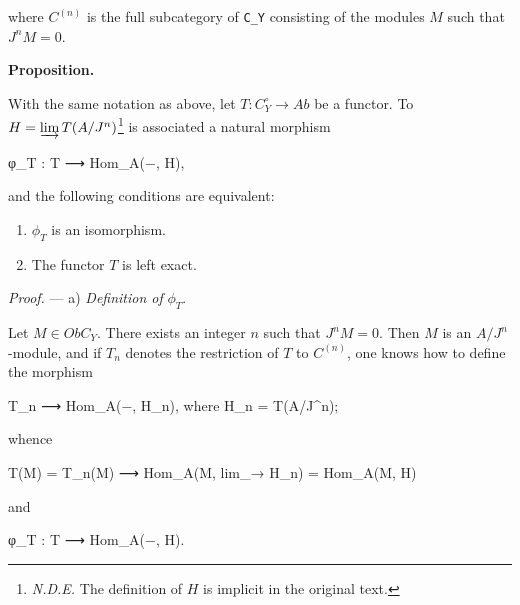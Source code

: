\documentclass[
  11pt,
  a4paper,
]{book}
\newenvironment{Shaded}{}{}
\newcommand{\NormalTok}[1]{#1}
\providecommand{\tightlist}{%
  \setlength{\itemsep}{0pt}\setlength{\parskip}{0pt}}
\begin{document}
where \(C^{(n)}\) is the full subcategory of \texttt{C\_Y} consisting of
the modules \(M\) such that \(J^{n} M = 0\).

\textbf{Proposition.}

With the same notation as above, let \(T : C^{\circ}_{Y} \to Ab\) be a
functor. To \(H = \varinjlim
T(A/J^{n})\)\footnote{\emph{N.D.E.} The definition of \(H\) is implicit
  in the original text.} is associated a natural morphism

\begin{Shaded}
\begin{Highlighting}[]
\NormalTok{φ\_T : T ⟶ Hom\_A(−, H),}
\end{Highlighting}
\end{Shaded}

and the following conditions are equivalent:

\begin{enumerate}
\def\labelenumi{\arabic{enumi}.}
\tightlist
\item
  \(\phi_{T}\) is an isomorphism.
\item
  The functor \(T\) is left exact.
\end{enumerate}

\emph{Proof.} --- a) \emph{Definition of} \(\phi_{T}\).

Let \(M \in Ob C_{Y}\). There exists an integer \(n\) such that
\(J^{n} M = 0\). Then \(M\) is an \(A/J^{n}\)-module, and if \(T_{n}\)
denotes the restriction of \(T\) to \(C^{(n)}\), one knows how to define
the morphism

\begin{Shaded}
\begin{Highlighting}[]
\NormalTok{T\_n ⟶ Hom\_A(−, H\_n),    where H\_n = T(A/J\^{}n);}
\end{Highlighting}
\end{Shaded}

whence

\begin{Shaded}
\begin{Highlighting}[]
\NormalTok{T(M) = T\_n(M) ⟶ Hom\_A(M, lim\_→ H\_n) = Hom\_A(M, H)}
\end{Highlighting}
\end{Shaded}

and

\begin{Shaded}
\begin{Highlighting}[]
\NormalTok{φ\_T : T ⟶ Hom\_A(−, H).}
\end{Highlighting}
\end{Shaded}
\end{document}
